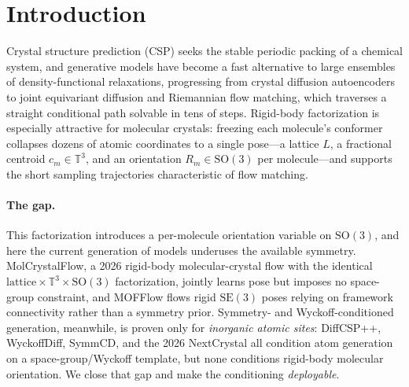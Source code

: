\documentclass[journal=jcisd8,manuscript=article]{achemso}
\begin{document}
\section{Introduction}
Crystal structure prediction (CSP) seeks the stable periodic packing of a chemical
system, and generative models have become a fast alternative to large ensembles of
density-functional relaxations, progressing from crystal diffusion
autoencoders\cite{xie2022cdvae} to joint equivariant
diffusion\cite{jiao2023diffcsp} and Riemannian flow
matching\cite{miller2024flowmm,lipman2023flowmatching,chen2024riemannian}, which
traverses a straight conditional path solvable in tens of steps. Rigid-body
factorization is especially attractive for molecular crystals: freezing each
molecule's conformer collapses dozens of atomic coordinates to a single pose---a
lattice $L$, a fractional centroid $c_m\in\mathbb{T}^3$, and an orientation
$R_m\in\mathrm{SO}(3)$ per molecule---and supports the short sampling trajectories
characteristic of flow matching.

\paragraph{The gap.} This factorization introduces a per-molecule orientation variable on
$\mathrm{SO}(3)$, and here the current generation of models underuses the available symmetry. MolCrystalFlow\cite{zeng2026molcrystalflow}, a 2026 rigid-body
molecular-crystal flow with the identical
$\text{lattice}\times\mathbb{T}^3\times\mathrm{SO}(3)$ factorization, jointly
learns pose but imposes no space-group constraint, and
MOFFlow\cite{kim2025mofflow} flows rigid $\mathrm{SE}(3)$ poses relying on
framework connectivity rather than a symmetry prior. Symmetry- and
Wyckoff-conditioned generation, meanwhile, is proven only for \emph{inorganic
atomic sites}: DiffCSP++\cite{jiao2024diffcsppp},
WyckoffDiff\cite{wyckoffdiff2025}, SymmCD\cite{symmcd2025}, and the 2026
NextCrystal\cite{mu2026nextcrystal} all condition atom generation on a
space-group/Wyckoff template, but none conditions rigid-body molecular
orientation. We close that gap and make the conditioning \emph{deployable}.
\end{document}
